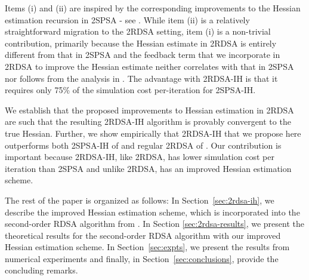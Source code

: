 \documentclass[letterpaper, 10 pt, conference]{ieeeconf}  %
\begin{document}
Items (i) and (ii) are inspired by the corresponding improvements to the Hessian estimation recursion in 2SPSA - see \cite{spall-jacobian}. While item (ii) is a relatively straightforward migration to the 2RDSA setting, item (i) is a non-trivial contribution, primarily because the Hessian estimate in 2RDSA is entirely different from that in 2SPSA and the feedback term that we incorporate in 2RDSA to improve the Hessian estimate neither correlates with that in 2SPSA nor follows from the analysis in \cite{spall-jacobian}. 
The advantage with 2RDSA-IH is that it requires only 75\% of the simulation cost per-iteration for 2SPSA-IH. 

We establish that the proposed improvements to Hessian estimation in 2RDSA are such  that the resulting 2RDSA-IH algorithm is provably convergent to the true Hessian. 
Further, we show empirically that 2RDSA-IH that we propose here outperforms both 2SPSA-IH of \cite{spall-jacobian} and regular 2RDSA of \cite{prashanth2015rdsa}. Our contribution is important because 2RDSA-IH, like 2RDSA, has lower simulation cost per iteration than 2SPSA and unlike 2RDSA, has an improved Hessian estimation scheme.

The rest of the paper is organized as follows: In Section~\ref{sec:2rdsa-ih}, we
describe the improved Hessian estimation scheme, which is incorporated into the  second-order RDSA algorithm from \cite{prashanth2015rdsa}. In Section \ref{sec:2rdsa-results}, we present the theoretical results for the second-order RDSA algorithm with our improved Hessian estimation scheme.
In Section~\ref{sec:expts}, we present the results from numerical experiments and finally, in  Section~\ref{sec:conclusions}, provide the concluding remarks.
\end{document}
